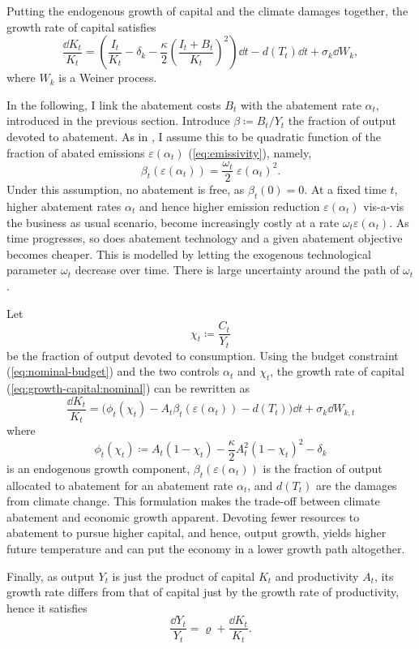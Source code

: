 \documentclass[../../main.tex]{subfiles}
\begin{document}
Putting the endogenous growth of capital and the climate damages together, the growth rate of capital satisfies \begin{equation} \label{eq:growth-capital:nominal}
    \frac{\dd{K}_t}{K_t} = \left(\frac{I_t}{K_t} - \delta_k - \frac{\kappa}{2} \left( \frac{I_t + B_t}{K_t} \right)^2 \right) \dd{t} - d(T_t) \dd{t} + \sigma_k \dd{W}_k,
\end{equation} where $W_k$ is a Weiner process.


In the following, I link the abatement costs $B_t$ with the abatement rate $\alpha_t$, introduced in the previous section. Introduce $\beta \coloneqq B_t / Y_t$ the fraction of output devoted to abatement. As in \cite{nordhaus_optimal_1992}, I assume this to be quadratic function of the fraction of abated emissions $\varepsilon(\alpha_t)$ (\ref{eq:emissivity}), namely, \begin{equation} \label{eq:abatement-costs}
    \beta_t(\varepsilon(\alpha_t)) = \frac{\omega_t}{2} \; \varepsilon(\alpha_t)^2.
\end{equation} Under this assumption, no abatement is free, as $\beta_t(0) = 0$. At a fixed time $t$, higher abatement rates $\alpha_t$ and hence higher emission reduction $\varepsilon(\alpha_t)$ vis-a-vis the business as usual scenario, become increasingly costly at a rate $\omega_t \varepsilon(\alpha_t)$. As time progresses, so does abatement technology and a given abatement objective becomes cheaper. This is modelled by letting the exogenous technological parameter $\omega_t$ decrease over time. There is large uncertainty around the path of $\omega_t$. %

Let \begin{equation}
    \chi_t \coloneqq \frac{C_t}{Y_t}
\end{equation} be the fraction of output devoted to consumption. Using the budget constraint (\ref{eq:nominal-budget}) and the two controls $\alpha_t$ and $\chi_t$, the growth rate of capital (\ref{eq:growth-capital:nominal}) can be rewritten as \begin{equation}
    \frac{\dd{K_t}}{K_t} = \Big(\phi_t(\chi_t) - A_t \beta_t(\varepsilon(\alpha_t)) - d(T_t) \Big) \dd{t} + \sigma_k \dd{W}_{k, t}
\end{equation} where \begin{equation}
    \phi_t(\chi_t) \coloneqq A_t (1 - \chi_t) - \frac{\kappa}{2} A_t^2 (1 - \chi_t)^2 - \delta_k
\end{equation} is an endogenous growth component, $\beta_t(\varepsilon(\alpha_t))$ is the fraction of output allocated to abatement for an abatement rate  $\alpha_t$, and $d(T_t)$ are the damages from climate change. This formulation makes the trade-off between climate abatement and economic growth apparent. Devoting fewer resources to abatement to pursue higher capital, and hence, output growth, yields higher future temperature and can put the economy in a lower growth path altogether.

Finally, as output $Y_t$ is just the product of capital $K_t$ and productivity $A_t$, its growth rate differs from that of capital just by the growth rate of productivity, hence it satisfies \begin{equation}
    \frac{\dd{Y}_t}{Y_t} = \varrho + \frac{\dd{K}_t}{K_t}. 
\end{equation}
\end{document}
